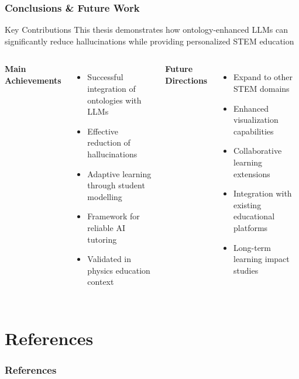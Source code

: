 \documentclass{beamer}
\begin{document}
\begin{frame}
\frametitle{Conclusions \& Future Work}

\begin{block}{Key Contributions}
This thesis demonstrates how ontology-enhanced LLMs can significantly reduce hallucinations while providing personalized STEM education
\end{block}

\begin{columns}

\textbf{Main Achievements}
\begin{itemize}
    \item Successful integration of ontologies with LLMs
    \item Effective reduction of hallucinations
    \item Adaptive learning through student modelling
    \item Framework for reliable AI tutoring
    \item Validated in physics education context
\end{itemize}

\textbf{Future Directions}
\begin{itemize}
    \item Expand to other STEM domains
    \item Enhanced visualization capabilities
    \item Collaborative learning extensions
    \item Integration with existing educational platforms
    \item Long-term learning impact studies
\end{itemize}

\end{columns}
\end{frame}

\section{References}
\begin{frame}[allowframebreaks]
\frametitle{References}


\end{frame}
\end{document}
